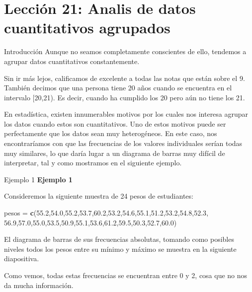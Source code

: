 \documentclass[
  ignorenonframetext,
  aspectratio=169]{beamer}
\newenvironment{Shaded}{\begin{snugshade}}{\end{snugshade}}
\newcommand{\FloatTok}[1]{\textcolor[rgb]{0.00,0.00,0.81}{#1}}
\newcommand{\FunctionTok}[1]{\textcolor[rgb]{0.13,0.29,0.53}{\textbf{#1}}}
\newcommand{\NormalTok}[1]{#1}
\newcommand{\OtherTok}[1]{\textcolor[rgb]{0.56,0.35,0.01}{#1}}
\begin{document}
\section{Lección 21: Analis de datos cuantitativos
agrupados}\label{lecciuxf3n-21-analis-de-datos-cuantitativos-agrupados}

\begin{frame}{Introducción}
\label{introducciuxf3n-1}
Aunque no seamos completamente conscientes de ello, tendemos a agrupar
datos cuantitativos constantemente.

Sin ir más lejos, calificamos de excelente a todas las notas que están
sobre el 9. También decimos que una persona tiene 20 años cuando se
encuentra en el intervalo {[}20,21). Es decir, cuando ha cumplido los 20
pero aún no tiene los 21.

En estadística, existen innumerables motivos por los cuales nos interesa
agrupar los datos cuando estos son cuantitativos. Uno de estos motivos
puede ser perfectamente que los datos sean muy heterogéneos. En este
caso, nos encontraríamos con que las frecuencias de los valores
individuales serían todas muy similares, lo que daría lugar a un
diagrama de barras muy difícil de interpretar, tal y como mostramos en
el siguiente ejemplo.
\end{frame}

\begin{frame}[fragile]{Ejemplo 1}
\label{ejemplo-1-8}
\textbf{Ejemplo 1}

Consideremos la siguiente muestra de 24 pesos de estudiantes:

\begin{Shaded}
\begin{Highlighting}[]
\NormalTok{pesos }\OtherTok{=} \FunctionTok{c}\NormalTok{(}\FloatTok{55.2}\NormalTok{,}\FloatTok{54.0}\NormalTok{,}\FloatTok{55.2}\NormalTok{,}\FloatTok{53.7}\NormalTok{,}\FloatTok{60.2}\NormalTok{,}\FloatTok{53.2}\NormalTok{,}\FloatTok{54.6}\NormalTok{,}\FloatTok{55.1}\NormalTok{,}\FloatTok{51.2}\NormalTok{,}\FloatTok{53.2}\NormalTok{,}\FloatTok{54.8}\NormalTok{,}\FloatTok{52.3}\NormalTok{,}
          \FloatTok{56.9}\NormalTok{,}\FloatTok{57.0}\NormalTok{,}\FloatTok{55.0}\NormalTok{,}\FloatTok{53.5}\NormalTok{,}\FloatTok{50.9}\NormalTok{,}\FloatTok{55.1}\NormalTok{,}\FloatTok{53.6}\NormalTok{,}\FloatTok{61.2}\NormalTok{,}\FloatTok{59.5}\NormalTok{,}\FloatTok{50.3}\NormalTok{,}\FloatTok{52.7}\NormalTok{,}\FloatTok{60.0}\NormalTok{)}
\end{Highlighting}
\end{Shaded}

El diagrama de barras de sus frecuencias absolutas, tomando como
posibles niveles todos los pesos entre su mínimo y máximo se muestra en
la siguiente diapositiva.

Como vemos, todas estas frecuencias se encuentran entre 0 y 2, cosa que
no nos da mucha información.
\end{frame}
\end{document}
